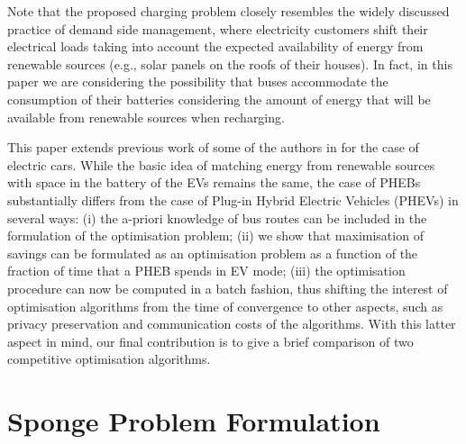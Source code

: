 \documentclass[journal]{IEEEtran}
\begin{document}
Note that the proposed charging problem closely resembles the widely discussed practice of demand side management, where electricity customers shift their electrical loads taking into account the expected availability of energy from renewable sources (e.g., solar panels on the roofs of their houses). In fact, in this paper we are considering the possibility that buses accommodate the consumption of their batteries considering the amount of energy that will be available from renewable sources when recharging.

This paper extends previous work of some of the authors in \cite{Sponge_IJC} for the case of electric cars. While the basic idea of matching energy from renewable sources with space in the battery of the EVs remains the same, the case of PHEBs substantially differs from the case of Plug-in Hybrid Electric Vehicles (PHEVs) in several ways: (i) the a-priori knowledge of bus routes can be included in the formulation of the optimisation problem; (ii) we show that maximisation of  savings can be formulated as an optimisation problem as a function of the fraction of time that a PHEB spends in EV mode; (iii) the optimisation procedure can now be computed in a batch fashion, thus shifting the interest of optimisation algorithms from the time of convergence to other aspects, such as privacy preservation and communication costs of the algorithms. With this latter aspect in mind, our final contribution is to give a brief comparison of two competitive optimisation algorithms.




\section{Sponge Problem Formulation}
\label{Formulation}
\end{document}
